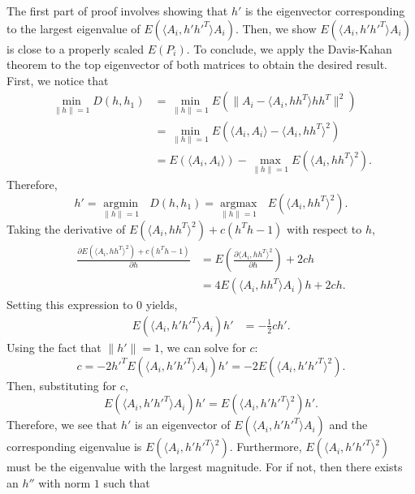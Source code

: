 \documentclass[10pt,journal,compsoc]{IEEEtran}
\newenvironment{proof}[1][Proof]{\begin{trivlist}
		\item[\hskip \labelsep {\bfseries #1}]}{\end{trivlist}}
\begin{document}
\begin{proof} [Proof of Theorem 4.2]
The first part of proof involves showing that $h'$ is the eigenvector corresponding to the largest eigenvalue of $E(\langle A_{i},h' h'^T \rangle A_{i})$. Then, we show $E(\langle A_{i},h' h'^T \rangle A_{i})$ is close to a properly scaled $E(P_i)$. To conclude, we apply the Davis-Kahan theorem to the top eigenvector of both matrices to obtain the desired result. First, we notice that
	\begin{align*}
	\underset{\|h\| =1}{\operatorname{min}}D(h,h_1) &=\underset{\|h\| =1}{\operatorname{min}}E(\|A_i- \langle A_i,h h^T \rangle h h^T\|^2) \\
	&=\underset{\|h\| =1}{\operatorname{min}}E(\langle A_i,A_i \rangle- \langle A_i,h h^T \rangle ^2) \\
	&=E(\langle A_i,A_i \rangle)-\underset{\|h\| =1}{\operatorname{max}}E( \langle A_i,h h^T \rangle ^2).
	\end{align*}
	Therefore, 
	\begin{equation} \label{eq:5}
	h'= \underset{\|h\| =1}{\operatorname{argmin}} \text{ }D(h,h_1)=\underset{\|h\| =1}{\operatorname{argmax}} \text{ } E(\langle A_i,h h^T \rangle ^2) .
	\end{equation}
	Taking the derivative of $E( \langle A_i,h h^T \rangle ^2)+ c(h^Th-1)$ with respect to $h$,
	\begin{align*}
	\frac{\partial E( \langle A_i,h h^T \rangle ^2)+ c(h^Th-1) }{\partial h} & =  E(\frac{\partial  \langle A_i,h h^T \rangle ^2}{\partial h}) +2ch \\
	&=4 E( \langle A_i,h h^T \rangle A_i)h +2ch .
	\end{align*}
	Setting this expression to $0$ yields,
	\begin{align*} 
	E( \langle A_i,h' h'^T \rangle A_i)h' & = -\frac{1}{2}ch' .
	\end{align*}
	Using the fact that $\|h'\|=1$, we can solve for $c$:
	\[c = -2 h'^T E( \langle A_i,h' h'^T \rangle A_i)h' = -2 E( \langle A_i,h' h'^T \rangle^2) .\]
	Then, substituting for $c$, 
	\begin{equation}
	E( \langle A_i,h' h'^T \rangle A_i)h'=E( \langle A_i,h' h'^T \rangle^2)h'.
	\end{equation}
	Therefore, we see that $h'$ is an eigenvector of $E(\langle A_{i},h' h'^T \rangle A_{i})$ and the corresponding eigenvalue is $E(\langle A_{i},h' h'^T \rangle ^2)$. Furthermore, $E(\langle A_{i},h' h'^T \rangle ^2)$ must be the eigenvalue with the largest magnitude. For if not, then there exists an $h''$ with norm $1$ such that

\end{proof}
\end{document}
